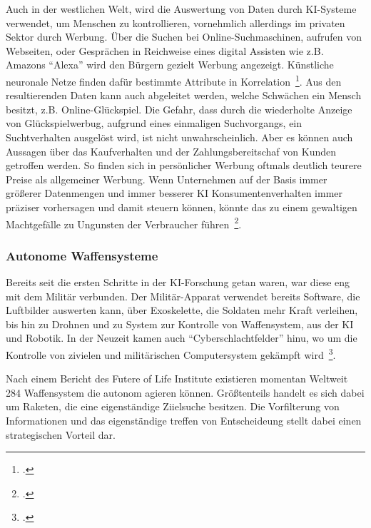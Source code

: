 Auch in der westlichen Welt, wird die Auswertung von Daten durch \ac{KI}-Systeme verwendet, um Menschen zu kontrollieren, vornehmlich allerdings im privaten Sektor durch Werbung.
Über die Suchen bei Online-Suchmaschinen, aufrufen von Webseiten, oder Gesprächen in Reichweise eines digital Assisten wie z.B. Amazons \enquote{Alexa} wird den Bürgern
gezielt Werbung angezeigt. Künstliche neuronale Netze finden dafür bestimmte Attribute in Korrelation~\footcite[\vglf][]{Kipper.2020}.
Aus den resultierenden Daten kann auch abgeleitet werden, welche Schwächen ein Mensch besitzt, z.B. Online-Glückspiel. Die Gefahr, dass durch die wiederholte Anzeige von 
Glückspielwerbug, aufgrund eines einmaligen Suchvorgangs, ein Suchtverhalten ausgelöst wird, ist nicht unwahrscheinlich.
Aber es können auch Aussagen über das Kaufverhalten und der Zahlungsbereitschaf von Kunden getroffen werden. So finden sich in persönlicher Werbung oftmals deutlich
teurere Preise als allgemeiner Werbung.
Wenn Unternehmen auf der Basis immer größerer Datenmengen und immer besserer KI Konsumentenverhalten immer präziser vorhersagen und damit steuern können, 
könnte das zu einem gewaltigen Machtgefälle zu Ungunsten der Verbraucher führen~\footcite[\vglf][]{Kipper.2020}.


\subsubsection{Autonome Waffensysteme}

Bereits seit die ersten Schritte in der \ac{KI}-Forschung getan waren, war diese eng mit dem Militär verbunden. Der Militär-Apparat verwendet bereits Software, die Luftbilder auswerten kann,
über Exoskelette, die Soldaten mehr Kraft verleihen, bis hin zu Drohnen und zu System zur Kontrolle von Waffensystem, aus der \ac{KI} und Robotik.
In der Neuzeit kamen auch \enquote{Cyberschlachtfelder} hinu, wo um die Kontrolle von zivielen und militärischen Computersystem gekämpft wird~\footcite[\vglf][]{Lenzen.2020}.

Nach einem Bericht des Futere of Life Institute existieren momentan Weltweit 284 Waffensystem die autonom agieren können. Größtenteils handelt es sich dabei um Raketen,
die eine eigenständige Ziielsuche besitzen. Die Vorfilterung von Informationen und das eigenständige treffen von Entscheideung stellt dabei einen strategischen Vorteil dar. 

